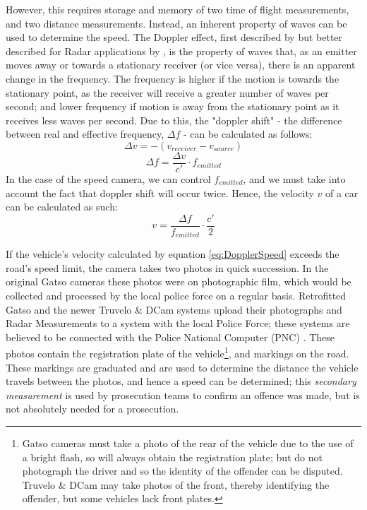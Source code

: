 \documentclass[11pt, a4paper, notitlepage]{report}
\begin{document}
However, this requires storage and memory of two time of flight measurements, and two distance measurements. Instead, an inherent property of waves can be used to determine the speed. The Doppler effect, first described by \citet{dopplerGerman} but better described for Radar applications by \citet{dopplerWolff}, is the property of waves that, as an emitter moves away or towards a stationary receiver (or vice versa), there is an apparent change in the frequency. The frequency is higher if the motion is towards the stationary point, as the receiver will receive a greater number of waves per second; and lower frequency if motion is away from the stationary point as it receives less waves per second. Due to this, the "doppler shift" - the difference between real and effective frequency, $ \Delta f $ - can be calculated as follows:
\begin{equation}
	\Delta v = -(v_{receiver} - v_{source})
\end{equation}
\begin{equation}
	\Delta f = \frac{\Delta v}{c'} \cdot f_{emitted}
\end{equation}
In the case of the speed camera, we can control $ f_{emitted} $, and we must take into account the fact that doppler shift will occur twice. Hence, the velocity $ v $ of a car can be calculated as such:
\begin{equation}\label{eq:DopplerSpeed}
	v = \frac{\Delta f}{f_{emitted}} \cdot \frac{c'}{2}
\end{equation}

If the vehicle's velocity calculated by equation \ref{eq:DopplerSpeed} exceeds the road's speed limit, the camera takes two photos in quick succession. In the original Gatso cameras these photos were on photographic film, which would be collected and processed by the local police force on a regular basis. Retrofitted Gatso and the newer Truvelo \& DCam systems upload their photographs and Radar Measurements to a system with the local Police Force; these systems are believed to be connected with the Police National Computer (PNC) \citep{PNC}. These photos contain the registration plate of the vehicle\footnote{Gatso cameras must take a photo of the rear of the vehicle due to the use of a bright flash, so will always obtain the registration plate; but do not photograph the driver and so the identity of the offender can be disputed. Truvelo \& DCam may take photos of the front, thereby identifying the offender, but some vehicles lack front plates.}, and markings on the road. These markings are graduated and are used to determine the distance the vehicle travels between the photos, and hence a speed can be determined; this \textit{secondary measurement} is used by prosecution teams to confirm an offence was made, but is not absolutely needed for a prosecution.
\end{document}
